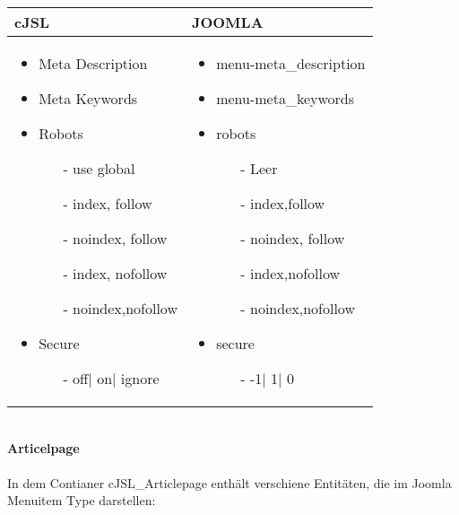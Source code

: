 \begin{minipage}{0.6\textwidth}
\begin{tabular}{|p{}|p{} |}
\hline
\textbf{cJSL} 
&  
\textbf{JOOMLA} \\ \hline
\begin{itemize}
\item Meta Description
    \item Meta Keywords
    \item Robots
    \begin{enumerate}
	    \item[-] use global
	    \item[-] index, follow
	    \item[-] noindex, follow
	    \item[-]index, nofollow
	    \item[-] noindex,nofollow
    \end{enumerate}
    \item Secure
    \begin{enumerate}
	    \item[-]off| on| ignore
    \end{enumerate}
\end{itemize}
&
\begin{itemize}
\item menu-meta\_description
\item menu-meta\_keywords
\item robots
	\begin{enumerate}
	\item[-] Leer
	\item[-] index,follow
	\item[-] noindex, follow
	\item[-] index,nofollow
	\item[-] noindex,nofollow
	\end{enumerate}
\item secure
	\begin{enumerate}
	\item[-]-1| 1| 0
	\end{enumerate}
\end{itemize} \\ \hline
\end{tabular}
\end{minipage}
\linebreak
\\
\textbf{Articelpage}
\\
\\
In dem Contianer cJSL\_Articlepage enthält verschiene Entitäten, die im Joomla Menuitem Type darstellen:

